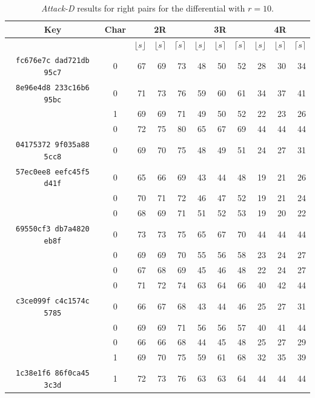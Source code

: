 \begin{table}[ht]
\begin{center}
\begin{tabular}{|c|c||r|r|r||r|r|r||r|r|r|}
\hline
Key & Char & \multicolumn{3}{|c||}{2R} & \multicolumn{3}{|c||}{3R} &  \multicolumn{3}{|c|}{4R}\\
\hline
& & $\lfloor s \rfloor$ & $\lfloor s \rceil$ & $\lceil s \rceil$ & $\lfloor s \rfloor$ & $\lfloor s \rceil$ & $\lceil s \rceil$ & $\lfloor s \rfloor$ & $\lfloor s \rceil$ & $\lceil s \rceil$ \\
\hline
\texttt{fc676e7c dad721db 95c7} & 0 & 67 & 69 & 73 & 48 & 50 & 52 & 28 & 30 & 34\\
\hline
\texttt{8e96e4d8 233c16b6 95bc} & 0 & 71 & 73 & 76 & 59 & 60 & 61 & 34 & 37 & 41\\
                                & 1 & 69 & 69 & 71 & 49 & 50 & 52 & 22 & 23 & 26\\
                                & 0 & 72 & 75 & 80 & 65 & 67 & 69 & 44 & 44 & 44\\
\hline
\texttt{04175372 9f035a88 5cc8} & 0 & 69 & 70 & 75 & 48 & 49 & 51 & 24 & 27 & 31\\
\hline
\texttt{57ec0ee8 eefc45f5 d41f} & 0 & 65 & 66 & 69 & 43 & 44 & 48 & 19 & 21 & 26\\
                                & 0 & 70 & 71 & 72 & 46 & 47 & 52 & 19 & 21 & 24\\
                                & 0 & 68 & 69 & 71 & 51 & 52 & 53 & 19 & 20 & 22\\
\hline
\texttt{69550cf3 db7a4820 eb8f} & 0 & 73 & 73 & 75 & 65 & 67 & 70 & 44 & 44 & 44\\
                                & 0 & 69 & 69 & 70 & 55 & 56 & 58 & 23 & 24 & 27\\
                                & 0 & 67 & 68 & 69 & 45 & 46 & 48 & 22 & 24 & 27\\
                                & 0 & 71 & 72 & 74 & 63 & 64 & 66 & 40 & 42 & 44\\
\hline
\texttt{c3ce099f c4c1574c 5785} & 0 & 66 & 67 & 68 & 43 & 44 & 46 & 25 & 27 & 31\\
                                & 0 & 69 & 69 & 71 & 56 & 56 & 57 & 40 & 41 & 44\\
                                & 0 & 66 & 66 & 68 & 44 & 45 & 48 & 25 & 27 & 29\\
                                & 1 & 69 & 70 & 75 & 59 & 61 & 68 & 32 & 35 & 39\\
\hline
\texttt{1c38e1f6 86f0ca45 3c3d} & 1 & 72 & 73 & 76 & 63 & 63 & 64 & 44 & 44 & 44\\
\hline
\end{tabular}
\end{center}
\caption{\emph{Attack-D} results for right pairs for the differential with $r=10$.}
\label{tab:present-80-14-attack-d}
\end{table}

